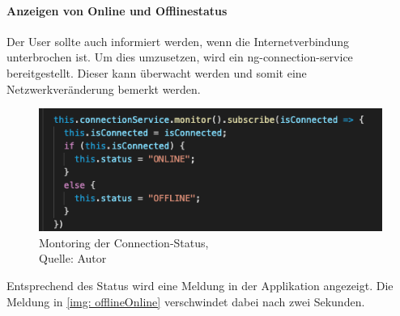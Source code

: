 \paragraph{Anzeigen von Online und Offlinestatus}
Der User sollte auch informiert werden, wenn die Internetverbindung unterbrochen ist. Um dies umzusetzen, wird ein ng-connection-service bereitgestellt. Dieser kann überwacht werden und somit eine Netzwerkveränderung bemerkt werden. 
 \begin{figure}[H]
	\centering
	\includegraphics[scale=0.6]{images/connectionService.PNG}
	\caption[Montoring der Connection-Status]{Montoring der Connection-Status,\\ Quelle: Autor}
	\label{img: connectionState}
\end{figure} 
Entsprechend des Status wird eine Meldung in der Applikation angezeigt. Die Meldung in \ref{img: offlineOnline} verschwindet dabei nach zwei Sekunden. 
